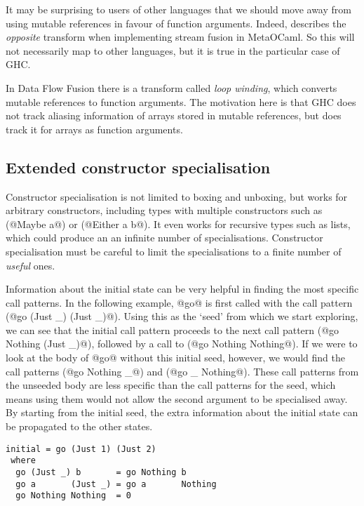 It may be surprising to users of other languages that we should move away from using mutable references in favour of function arguments.
Indeed, \citet{biboudis2017expressive} describes the \emph{opposite} transform when implementing stream fusion in MetaOCaml.
So this will not necessarily map to other languages, but it is true in the particular case of GHC.

In Data Flow Fusion \cite{lippmeier2013data} there is a transform called \emph{loop winding}, which converts mutable references to function arguments.
The motivation here is that GHC does not track aliasing information of arrays stored in mutable references, but does track it for arrays as function arguments.

\subsection{Extended constructor specialisation}

Constructor specialisation is not limited to boxing and unboxing, but works for arbitrary constructors, including types with multiple constructors such as (@Maybe a@) or (@Either a b@).
It even works for recursive types such as lists, which could produce an an infinite number of specialisations.
Constructor specialisation must be careful to limit the specialisations to a finite number of \emph{useful} ones.

Information about the initial state can be very helpful in finding the most specific call patterns.
In the following example, @go@ is first called with the call pattern (@go (Just _) (Just _)@).
Using this as the `seed' from which we start exploring, we can see that the initial call pattern proceeds to the next call pattern (@go Nothing (Just _)@), followed by a call to (@go Nothing Nothing@).
If we were to look at the body of @go@ without this initial seed, however, we would find the call patterns (@go Nothing _@) and (@go _ Nothing@).
These call patterns from the unseeded body are less specific than the call patterns for the seed, which means using them would not allow the second argument to be specialised away.
By starting from the initial seed, the extra information about the initial state can be propagated to the other states.

\begin{lstlisting}
initial = go (Just 1) (Just 2)
 where
  go (Just _) b       = go Nothing b
  go a       (Just _) = go a       Nothing
  go Nothing Nothing  = 0
\end{lstlisting}

